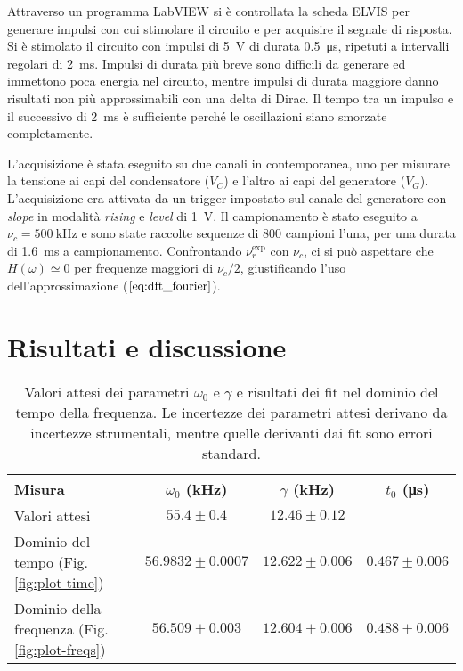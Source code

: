 \documentclass[12pt,a4paper, twocolumn]{article}
\begin{document}
Attraverso un programma LabVIEW si è controllata la scheda ELVIS per generare impulsi con cui stimolare il circuito e per acquisire il segnale di risposta. Si è stimolato il circuito con impulsi di \SI{5}{\volt} di durata \SI{0.5}{\micro\second}, ripetuti a intervalli regolari di \SI{2}{\milli\second}. Impulsi di durata più breve sono difficili da generare ed immettono poca energia nel circuito, mentre impulsi di durata maggiore danno risultati non più approssimabili con una delta di Dirac. Il tempo tra un impulso e il successivo di \SI{2}{\milli\second} è sufficiente perché le oscillazioni siano smorzate completamente.

L'acquisizione è stata eseguito su due canali in contemporanea, uno per misurare la tensione ai capi del condensatore ($V_C$) e l'altro ai capi del generatore ($V_G$). L'acquisizione era attivata da un trigger impostato sul canale del generatore con \emph{slope} in modalità \emph{rising} e \emph{level} di \SI{1}{\volt}. Il campionamento è stato eseguito a $\nu_c =\SI{500}{\kilo\hertz}$ e sono state raccolte sequenze di 800 campioni l'una, per una durata di \SI{1.6}{\milli\second} a campionamento. Confrontando $\nu_r^\text{exp}$ con $\nu_c$, ci si può aspettare che $H(\omega) \simeq 0$ per frequenze maggiori di $\nu_c/2$, giustificando l'uso dell'approssimazione ($\ref{eq:dft_fourier}$).

\section{Risultati e discussione}
\begin{table*}
\caption{Valori attesi dei parametri $\omega_0$ e $\gamma$ e risultati dei fit nel dominio del tempo della frequenza. Le incertezze dei parametri attesi derivano da incertezze strumentali, mentre quelle derivanti dai fit sono errori standard.}
\label{tab:params}
\centering
\begin{tabular}{lccc}
\toprule
Misura & $\omega_0$ (\si{\kilo\hertz}) & $\gamma$ (\si{\kilo\hertz}) & $t_0$ (\si{\micro\second})\\
\midrule
Valori attesi & $55.4 \pm 0.4 $ & $12.46 \pm 0.12$ & \\
Dominio del tempo (Fig. \ref{fig:plot-time}) & $56.9832 \pm 0.0007$ &  $12.622 \pm 0.006$ & $0.467 \pm 0.006$ \\
Dominio della frequenza (Fig. \ref{fig:plot-freqs}) & $56.509 \pm 0.003$ &  $12.604 \pm 0.006$ & $0.488 \pm 0.006$\\
\bottomrule
\end{tabular}
\end{table*}
\end{document}

